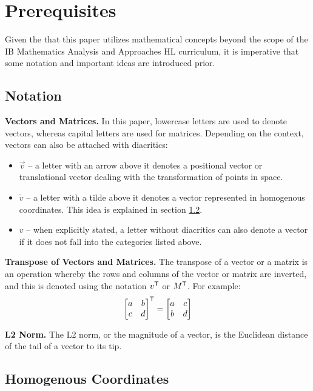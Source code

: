 \section{Prerequisites}

Given the that this paper utilizes mathematical concepts beyond the scope of the IB Mathematics Analysis and Approaches HL curriculum, it is imperative that some notation and important ideas are introduced prior.

\subsection{Notation}
\noindent\textbf{Vectors and Matrices.} In this paper, lowercase letters are used to denote vectors, whereas capital letters are used for matrices. Depending on the context, vectors can also be attached with diacritics:
\begin{itemize}[leftmargin=!, itemindent=-4ex]
    \item \textbf{$\vec{v}$} -- a letter with an arrow above it denotes a positional vector or translational vector dealing with the transformation of points in space.
    \item \textbf{$\widetilde{v}$} -- a letter with a tilde above it denotes a vector represented in homogenous coordinates. This idea is explained in section \ref{sec:homogenous}.
    \item \textbf{$v$} -- when explicitly stated, a letter without diacritics can also denote a vector if it does not fall into the categories listed above. 
\end{itemize}

\noindent\textbf{Transpose of Vectors and Matrices.} The transpose of a vector or a matrix is an operation whereby the rows and columns of the vector or matrix are inverted, and this is denoted using the notation $v^{\mathsf{T}}$ or $M^{\mathsf{T}}$. For example:
\[
    \begin{bmatrix}
        a & b \\
        c & d
    \end{bmatrix}^{\mathsf{T}}
    =
    \begin{bmatrix}
        a & c \\
        b & d
    \end{bmatrix}
\]

\noindent\textbf{L2 Norm.} The L2 norm, or the magnitude of a vector, is the Euclidean distance of the tail of a vector to its tip. 

\subsection{Homogenous Coordinates} \label{sec:homogenous}

